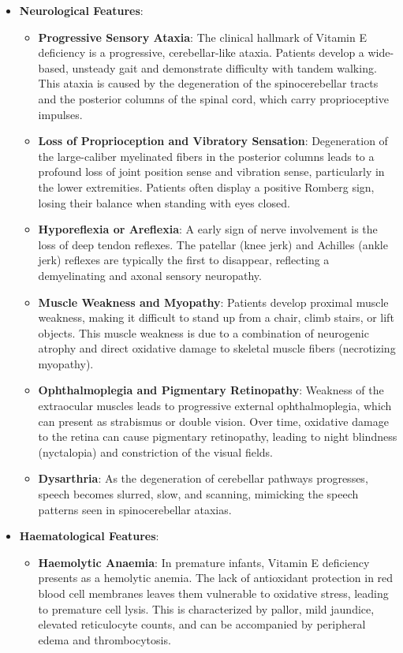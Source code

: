 \begin{itemize}
    \item \textbf{Neurological Features}:
    \begin{itemize}
        \item \textbf{Progressive Sensory Ataxia}: The clinical hallmark of Vitamin E deficiency is a progressive, cerebellar-like ataxia. Patients develop a wide-based, unsteady gait and demonstrate difficulty with tandem walking. This ataxia is caused by the degeneration of the spinocerebellar tracts and the posterior columns of the spinal cord, which carry proprioceptive impulses.
        \item \textbf{Loss of Proprioception and Vibratory Sensation}: Degeneration of the large-caliber myelinated fibers in the posterior columns leads to a profound loss of joint position sense and vibration sense, particularly in the lower extremities. Patients often display a positive Romberg sign, losing their balance when standing with eyes closed.
        \item \textbf{Hyporeflexia or Areflexia}: A early sign of nerve involvement is the loss of deep tendon reflexes. The patellar (knee jerk) and Achilles (ankle jerk) reflexes are typically the first to disappear, reflecting a demyelinating and axonal sensory neuropathy.
        \item \textbf{Muscle Weakness and Myopathy}: Patients develop proximal muscle weakness, making it difficult to stand up from a chair, climb stairs, or lift objects. This muscle weakness is due to a combination of neurogenic atrophy and direct oxidative damage to skeletal muscle fibers (necrotizing myopathy).
        \item \textbf{Ophthalmoplegia and Pigmentary Retinopathy}: Weakness of the extraocular muscles leads to progressive external ophthalmoplegia, which can present as strabismus or double vision. Over time, oxidative damage to the retina can cause pigmentary retinopathy, leading to night blindness (nyctalopia) and constriction of the visual fields.
        \item \textbf{Dysarthria}: As the degeneration of cerebellar pathways progresses, speech becomes slurred, slow, and scanning, mimicking the speech patterns seen in spinocerebellar ataxias.
    \end{itemize}
    \item \textbf{Haematological Features}:
    \begin{itemize}
        \item \textbf{Haemolytic Anaemia}: In premature infants, Vitamin E deficiency presents as a hemolytic anemia. The lack of antioxidant protection in red blood cell membranes leaves them vulnerable to oxidative stress, leading to premature cell lysis. This is characterized by pallor, mild jaundice, elevated reticulocyte counts, and can be accompanied by peripheral edema and thrombocytosis.

\end{itemize}
\end{itemize}
